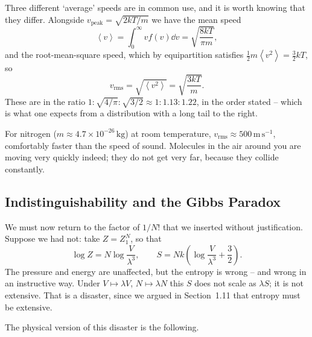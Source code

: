 \documentclass[a4paper]{scrartcl}
\newcommand{\avg}[1]{\left\langle #1 \right\rangle}
\begin{document}
\begin{center}
\end{center}

Three different `average' speeds are in common use, and it is worth knowing that they differ. Alongside $v_{\mathrm{peak}} = \sqrt{2kT/m}$ we have the mean speed
$$
\avg v = \int_0^\infty v f(v) \dd v = \sqrt{\frac{8kT}{\pi m}},
$$
and the root-mean-square speed, which by equipartition satisfies $\tfrac 12 m \avg{v^2} = \tfrac 32 kT$, so
$$
v_{\mathrm{rms}} = \sqrt{\avg{v^2}} = \sqrt{\frac{3kT}{m}}.
$$
These are in the ratio $1 : \sqrt{4/\pi} : \sqrt{3/2} \approx 1 : 1.13 : 1.22$, in the order stated -- which is what one expects from a distribution with a long tail to the right.

\begin{example}
	For nitrogen ($m \approx 4.7\times 10^{-26}\,\mathrm{kg}$) at room temperature, $v_{\mathrm{rms}} \approx 500\,\mathrm{m}\,\mathrm{s}^{-1}$, comfortably faster than the speed of sound. Molecules in the air around you are moving very quickly indeed; they do not get very far, because they collide constantly.
\end{example}

\subsection{Indistinguishability and the Gibbs Paradox}\label{sec:gibbsparadox}

We must now return to the factor of $1/N!$ that we inserted without justification. Suppose we had not: take $Z = Z_1^N$, so that
$$
\log Z = N \log \frac{V}{\lambda^3}, \qquad S = Nk\left(\log\frac{V}{\lambda^3} + \frac 32\right).
$$
The pressure and energy are unaffected, but the entropy is wrong -- and wrong in an instructive way. Under $V \mapsto \lambda V$, $N \mapsto \lambda N$ this $S$ does not scale as $\lambda S$; it is not extensive. That is a disaster, since we argued in Section~1.11 that entropy must be extensive.

The physical version of this disaster is the following.
\end{document}
